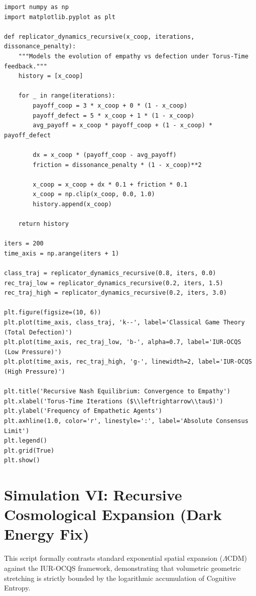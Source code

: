 \documentclass[12pt,openany]{book}
\begin{document}
\begin{verbatim}
import numpy as np
import matplotlib.pyplot as plt

def replicator_dynamics_recursive(x_coop, iterations, dissonance_penalty):
    """Models the evolution of empathy vs defection under Torus-Time feedback."""
    history = [x_coop]
    
    for _ in range(iterations):
        payoff_coop = 3 * x_coop + 0 * (1 - x_coop)
        payoff_defect = 5 * x_coop + 1 * (1 - x_coop)
        avg_payoff = x_coop * payoff_coop + (1 - x_coop) * payoff_defect
        
        dx = x_coop * (payoff_coop - avg_payoff)
        friction = dissonance_penalty * (1 - x_coop)**2 
        
        x_coop = x_coop + dx * 0.1 + friction * 0.1
        x_coop = np.clip(x_coop, 0.0, 1.0) 
        history.append(x_coop)
        
    return history

iters = 200
time_axis = np.arange(iters + 1)

class_traj = replicator_dynamics_recursive(0.8, iters, 0.0)
rec_traj_low = replicator_dynamics_recursive(0.2, iters, 1.5)
rec_traj_high = replicator_dynamics_recursive(0.2, iters, 3.0)

plt.figure(figsize=(10, 6))
plt.plot(time_axis, class_traj, 'k--', label='Classical Game Theory (Total Defection)')
plt.plot(time_axis, rec_traj_low, 'b-', alpha=0.7, label='IUR-OCQS (Low Pressure)')
plt.plot(time_axis, rec_traj_high, 'g-', linewidth=2, label='IUR-OCQS (High Pressure)')

plt.title('Recursive Nash Equilibrium: Convergence to Empathy')
plt.xlabel('Torus-Time Iterations ($\\leftrightarrow\\tau$)')
plt.ylabel('Frequency of Empathetic Agents')
plt.axhline(1.0, color='r', linestyle=':', label='Absolute Consensus Limit')
plt.legend()
plt.grid(True)
plt.show()
\end{verbatim}

\section{Simulation VI: Recursive Cosmological Expansion (Dark Energy Fix)}
This script formally contrasts standard exponential spatial expansion ($\Lambda$CDM) against the IUR-OCQS framework, demonstrating that volumetric geometric stretching is strictly bounded by the logarithmic accumulation of Cognitive Entropy.
\end{document}
